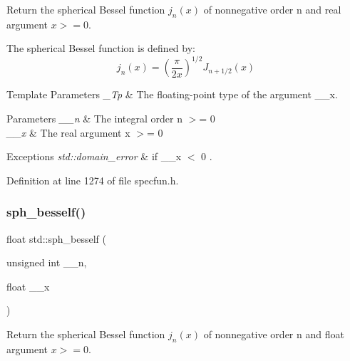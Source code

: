 Return the spherical Bessel function $ j_n(x) $ of nonnegative order n and real argument $ x >= 0 $.

The spherical Bessel function is defined by\+: \[ j_n(x) = \left(\frac{\pi}{2x} \right) ^{1/2} J_{n+1/2}(x) \]


\begin{DoxyTemplParams}{Template Parameters}
{\em \+\_\+\+Tp} & The floating-\/point type of the argument {\ttfamily \+\_\+\+\_\+x}. \\
\hline
\end{DoxyTemplParams}

\begin{DoxyParams}{Parameters}
{\em \+\_\+\+\_\+n} & The integral order {\ttfamily  n $>$= 0 } \\
\hline
{\em \+\_\+\+\_\+x} & The real argument {\ttfamily  x $>$= 0 } \\
\hline
\end{DoxyParams}

\begin{DoxyExceptions}{Exceptions}
{\em std\+::domain\+\_\+error} & if {\ttfamily  \+\_\+\+\_\+x $<$ 0 }. \\
\hline
\end{DoxyExceptions}


Definition at line 1274 of file specfun.\+h.

\mbox{\label{group__tr29124__math__spec__func_ga534e36e1dcefad8daec98920db16eec4}} 
\subsubsection{\texorpdfstring{sph\+\_\+besself()}{sph\_besself()}}
{\footnotesize\ttfamily float std\+::sph\+\_\+besself (\begin{DoxyParamCaption}\item[{unsigned int}]{\+\_\+\+\_\+n,  }\item[{float}]{\+\_\+\+\_\+x }\end{DoxyParamCaption})\hspace{0.3cm}{\ttfamily [inline]}}

Return the spherical Bessel function $ j_n(x) $ of nonnegative order n and {\ttfamily float} argument $ x >= 0 $.

